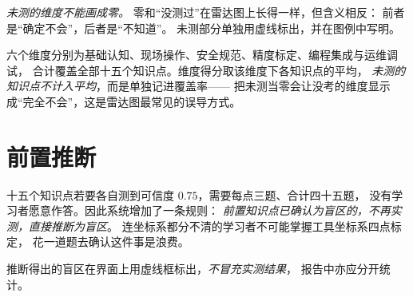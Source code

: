 \emph{未测的维度不能画成零。} 零和“没测过”在雷达图上长得一样，但含义相反：
前者是“确定不会”，后者是“不知道”。
未测部分单独用虚线标出，并在图例中写明。

六个维度分别为基础认知、现场操作、安全规范、精度标定、编程集成与运维调试，
合计覆盖全部十五个知识点。维度得分取该维度下各知识点的平均，
\emph{未测的知识点不计入平均}，而是单独记进覆盖率——
把未测当零会让没考的维度显示成“完全不会”，这是雷达图最常见的误导方式。

\section{前置推断}

十五个知识点若要各自测到可信度 $0.75$，需要每点三题、合计四十五题，
没有学习者愿意作答。因此系统增加了一条规则：
\emph{前置知识点已确认为盲区的，不再实测，直接推断为盲区}。
连坐标系都分不清的学习者不可能掌握工具坐标系四点标定，
花一道题去确认这件事是浪费。

推断得出的盲区在界面上用虚线框标出，\emph{不冒充实测结果}，
报告中亦应分开统计。



